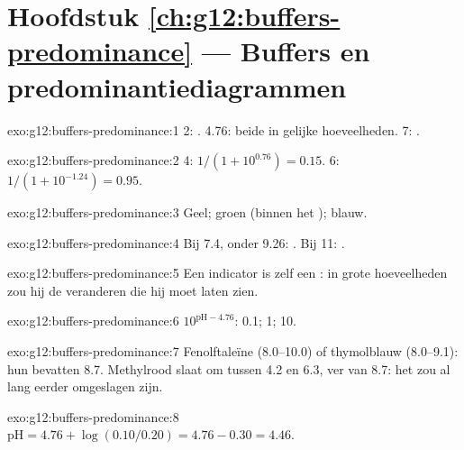\section*{Hoofdstuk \ref{ch:g12:buffers-predominance} --- Buffers en predominantiediagrammen}

\begin{solution}{exo:g12:buffers-predominance:1}
 2: .  4.76: beide in gelijke hoeveelheden.  7:
.
\end{solution}

\begin{solution}{exo:g12:buffers-predominance:2}
 4: $1/(1 + 10^{0.76}) = 0.15$.  6: $1/(1 + 10^{-1.24}) = 0.95$.
\end{solution}

\begin{solution}{exo:g12:buffers-predominance:3}
Geel; groen (binnen het ); blauw.
\end{solution}

\begin{solution}{exo:g12:buffers-predominance:4}
Bij  7.4, onder 9.26: . Bij  11: .
\end{solution}

\begin{solution}{exo:g12:buffers-predominance:5}
Een indicator is zelf een : in grote hoeveelheden zou hij
de  veranderen die hij moet laten zien.
\end{solution}

\begin{solution}{exo:g12:buffers-predominance:6}
$10^{\mathrm{pH} - 4.76}$: 0.1; 1; 10.
\end{solution}

\begin{solution}{exo:g12:buffers-predominance:7}
Fenolftaleïne (8.0--10.0) of thymolblauw (8.0--9.1): hun 
bevatten 8.7. Methylrood slaat om tussen 4.2 en 6.3, ver van 8.7: het zou
al lang eerder omgeslagen zijn.
\end{solution}

\begin{solution}{exo:g12:buffers-predominance:8}
$\mathrm{pH} = 4.76 + \log(0.10/0.20) = 4.76 - 0.30 = 4.46$.
\end{solution}

